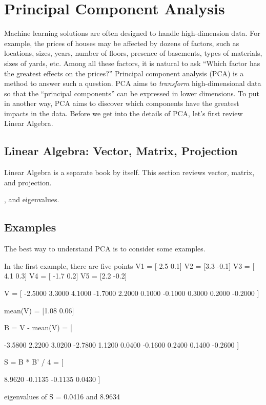 \chapter{Principal Component Analysis}
\label{chapter:pca}

Machine learning solutions are often designed to handle high-dimension
data. For example, the prices of houses may be affected by dozens of
factors, such as locations, sizes, years, number of floors, presence
of basements, types of materials, sizes of yards, etc.  Among all
these factors, it is natural to ask ``Which factor has the greatest
effects on the prices?''  Principal component analysis (PCA) is a
method to answer such a question.  PCA aims to {\it transform}
high-dimensional data so that the ``principal components'' can be
expressed in lower dimensions.  To put in another way, PCA aims to
discover which components have the greatest impacts in the data.
Before we get into the details of PCA, let's first review Linear
Algebra.

\section{Linear Algebra: Vector, Matrix, Projection}

Linear Algebra is a separate book by itself. This section reviews
vector, matrix, and projection.

, and eigenvalues.


\section{Examples}

The best way to understand PCA is to consider some examples.

In the first example, there are five points
V1 = [-2.5
       0.1]
V2 = [3.3
       -0.1]
V3 = [ 4.1
      0.3]
V4 = [ -1.7
     0.2]
V5 = [2.2
  -0.2]

V = [
     -2.5000    3.3000    4.1000   -1.7000    2.2000
    0.1000   -0.1000    0.3000    0.2000   -0.2000
  ]

mean(V) = [1.08
     0.06]

B = V - mean(V) =
[

   -3.5800    2.2200    3.0200   -2.7800    1.1200
    0.0400   -0.1600    0.2400    0.1400   -0.2600
]

S = B * B'  / 4
= [

    8.9620   -0.1135
   -0.1135    0.0430
]

eigenvalues of S = 0.0416 and 8.9634

